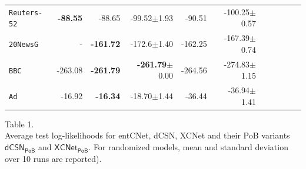 \documentclass[xcolor={usenames,dvipsnames,svgnames}, compress]{beamer}
\begin{document}
\begin{frame}[t]
\begin{table}[t]
\begin{tabular}{l rrrrrrrrrr}
    \texttt{Reuters-52}   &\textbf{-88.55}&-88.65&-99.52$\pm$1.93&-90.51&-100.25$\pm$0.57\\
    \texttt{20NewsG} & - &\textbf{-161.72}&-172.6$\pm$1.40&-162.25&-167.39$\pm$0.74\\
    \texttt{BBC}          &-263.08&\textbf{-261.79}&\textbf{-261.79}$\pm$0.00&-264.56&-274.83$\pm$1.15\\
    \texttt{Ad}           &-16.92&\textbf{-16.34}&-18.70$\pm$1.44&-36.44&-36.94$\pm$1.41\\
    \bottomrule
  \end{tabular}
  \label{tab:ll-sing}
\end{table}
\begin{minipage}{0.28\linewidth}
  \scriptsize
  \flushleft
  \vspace{-110pt}
  Table 1.\\
  Average test log-likelihoods for 
  \textsf{entCNet}, \textsf{dCSN}, \textsf{XCNet} and their
  \textsf{PoB} variants $\mathsf{dCSN_{PoB}}$ and $\mathsf{XCNet_{PoB}}$.
    For randomized models, mean and standard deviation over 10 runs are reported).
\end{minipage}
\end{frame}
\end{document}
